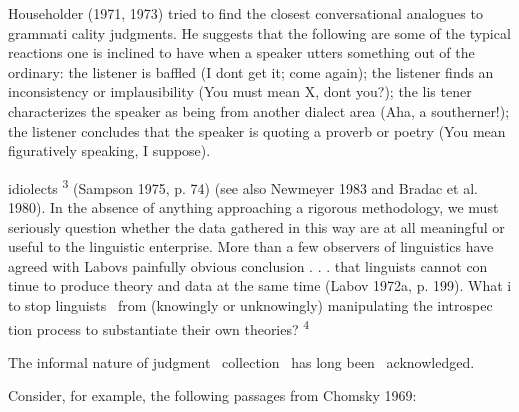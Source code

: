 \setcounter{listWWNumlxixleveli}{1}
\begin{listWWNumlxixleveli}
\item 
\begin{styleStandard}
Householder (1971, 1973) tried to find the closest conversational analogues to grammati\- cality judgments. He suggests that the following are some of the typical reactions one is inclined to have when a speaker utters something out of the ordinary: the listener is baffled ({\textquotedbl}I don{\textquotesingle}t get it; come again{\textquotedbl}); the listener finds an inconsistency or implausibility ({\textquotedbl}You must mean X, don{\textquotesingle}t you?{\textquotedbl}); the lis\- tener characterizes the speaker as being from another dialect area ({\textquotedbl}Aha, a southerner!{\textquotedbl}); the listener concludes that the speaker is quoting a proverb or poetry ({\textquotedbl}You mean {\textquotesingle}figuratively speaking,{\textquotesingle} I suppose{\textquotedbl}).
\end{styleStandard}


\end{listWWNumlxixleveli}
\clearpage\setcounter{page}{1}\begin{styleStandard}
idiolects{\textquotedbl} \textsuperscript{3}\textsuperscript{ }(Sampson 1975, p. 74) (see also Newmeyer 1983 and Bradac et al. 1980). In the absence of anything approaching a rigorous methodology, we must seriously question whether the data gathered in this way are at all meaningful or useful to the linguistic enterprise. More than a few observers of linguistics have agreed with Labov{\textquotesingle}s {\textquotedbl}painfully obvious conclusion . . . that linguists cannot con\- tinue to produce theory and data at the same time{\textquotedbl} (Labov 1972a, p. 199). What i to stop linguists \ from (knowingly or unknowingly) manipulating the introspec\- tion process to substantiate their own theories? \textsuperscript{4}
\end{styleStandard}


\begin{styleStandard}
The informal nature of judgment \ collection \ has long been \ acknowledged.
\end{styleStandard}


\begin{styleStandard}
Consider, for example, the following passages from Chomsky 1969:
\end{styleStandard}


